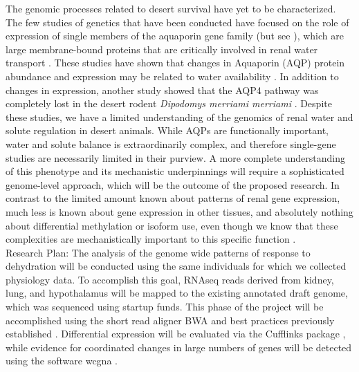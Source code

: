 \documentclass[11pt]{article}
\begin{document}
The genomic processes related to desert survival have yet to be characterized. The few studies of genetics that have been conducted have focused on the role of expression of single members of the aquaporin gene family (but see \cite{Bartolo:2007hy}), which are large membrane-bound proteins that are critically involved in renal water transport \citep{Kwon:2009bv,Verkman:2002ww,Brown:1995vo,Nielsen:1995cb}. These studies have shown that changes in Aquaporin (AQP) protein abundance and expression may be related to water availability \citep{Boselt:2009fb, Gallardo:2005fm,Bozinovic:2003eg}. In addition to changes in expression, another study showed that the AQP4 pathway was completely lost in the desert rodent \textit{Dipodomys merriami merriami} \citep{Huang:2001ti}. Despite these studies, we have a limited understanding of the genomics of renal water and solute regulation in desert animals. While AQPs are functionally important, water and solute balance is extraordinarily complex, and therefore single-gene studies are necessarily limited in their purview. A more complete understanding of this phenotype and its mechanistic underpinnings will require a sophisticated genome-level approach, which will be the outcome of the proposed research. In contrast to the limited amount known about patterns of renal gene expression, much less is known about gene expression in other tissues, and absolutely nothing about differential methylation or isoform use, even though we know that these complexities are mechanistically important to this specific function \citep{Yukutake:2010ia,Silberstein:2004ex}. \\

Research Plan: The analysis of the genome wide patterns of response to dehydration will be conducted using the same individuals for which we collected physiology data. To accomplish this goal, RNAseq reads derived from kidney, lung, and hypothalamus will be mapped to the existing annotated draft genome, which was sequenced using startup funds. This phase of the project will be accomplished using the short read aligner BWA \citep{Li:2013wn} and best practices previously established \citep{MacManes:2014io}. Differential expression will be evaluated via the Cufflinks package \citep{Trapnell:2012kp}, while evidence for coordinated changes in large numbers of genes will be detected using the software wcgna \citep{Langfelder:2008bd}. \\
\end{document}
